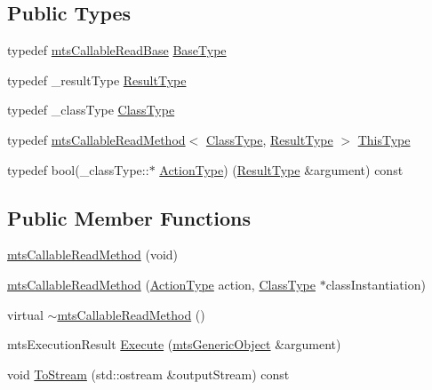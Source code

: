 \subsection*{Public Types}
\begin{DoxyCompactItemize}
\item 
typedef \hyperlink{classmts_callable_read_base}{mts\+Callable\+Read\+Base} \hyperlink{classmts_callable_read_method_a83876b0239f91889b077ab015b11f297}{Base\+Type}
\item 
typedef \+\_\+result\+Type \hyperlink{classmts_callable_read_method_ae1add51b4fb434797e00a79fe31aa7de}{Result\+Type}
\item 
typedef \+\_\+class\+Type \hyperlink{classmts_callable_read_method_a44650138085a29d60a4f3cb3616abbbf}{Class\+Type}
\item 
typedef \hyperlink{classmts_callable_read_method}{mts\+Callable\+Read\+Method}$<$ \hyperlink{classmts_callable_read_method_a44650138085a29d60a4f3cb3616abbbf}{Class\+Type}, \hyperlink{classmts_callable_read_method_ae1add51b4fb434797e00a79fe31aa7de}{Result\+Type} $>$ \hyperlink{classmts_callable_read_method_af176b353a29900c0d650356c559c4cdd}{This\+Type}
\item 
typedef bool(\+\_\+class\+Type\+::$\ast$ \hyperlink{classmts_callable_read_method_a9e05546d6f486e77f1df0c2b079dd7e1}{Action\+Type}) (\hyperlink{classmts_callable_read_method_ae1add51b4fb434797e00a79fe31aa7de}{Result\+Type} \&argument) const 
\end{DoxyCompactItemize}
\subsection*{Public Member Functions}
\begin{DoxyCompactItemize}
\item 
\hyperlink{classmts_callable_read_method_aaf583c2ff199486fe6691a1b50e0b67f}{mts\+Callable\+Read\+Method} (void)
\item 
\hyperlink{classmts_callable_read_method_a4295f9c815be10344bdb82a507a6906f}{mts\+Callable\+Read\+Method} (\hyperlink{classmts_callable_read_method_a9e05546d6f486e77f1df0c2b079dd7e1}{Action\+Type} action, \hyperlink{classmts_callable_read_method_a44650138085a29d60a4f3cb3616abbbf}{Class\+Type} $\ast$class\+Instantiation)
\item 
virtual \hyperlink{classmts_callable_read_method_a5ec1e7cf4524e99d9d08869395dc4e97}{$\sim$mts\+Callable\+Read\+Method} ()
\item 
mts\+Execution\+Result \hyperlink{classmts_callable_read_method_a832d2b329b3579304e1049be4d175b8d}{Execute} (\hyperlink{classmts_generic_object}{mts\+Generic\+Object} \&argument)
\item 
void \hyperlink{classmts_callable_read_method_ae08bd42677d0895a7fd4c80cc54cb4ff}{To\+Stream} (std\+::ostream \&output\+Stream) const 
\end{DoxyCompactItemize}
